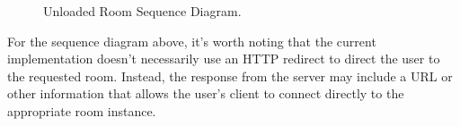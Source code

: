 \begin{figure}[!htb]
  \centering
  \caption{\label{Figure::unloaded-room} Unloaded Room Sequence Diagram.}
\end{figure}

For the sequence diagram above, it's worth noting that the current implementation doesn't necessarily use an HTTP
redirect to direct the user to the requested room. Instead, the response from the server may include a URL or other
information that allows the user's client to connect directly to the appropriate room instance.